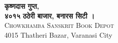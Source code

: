 \documentclass[11pt,a4paper]{article}
\newcommand{\dev}[1]{{\devanagarifont #1}}
\begin{document}
\vfill
\begin{center}
\textbf{\dev{कृष्णदास गुप्त,}}\\
\textbf{\dev{४०१५ ठठेरी बाजार, बनारस सिटी ।}}\\[0.5em]
\textsc{Chowkhamba Sanskrit Book Depot}\\
4015 Thatheri Bazar, Varanasi City
\end{center}

\end{document}

